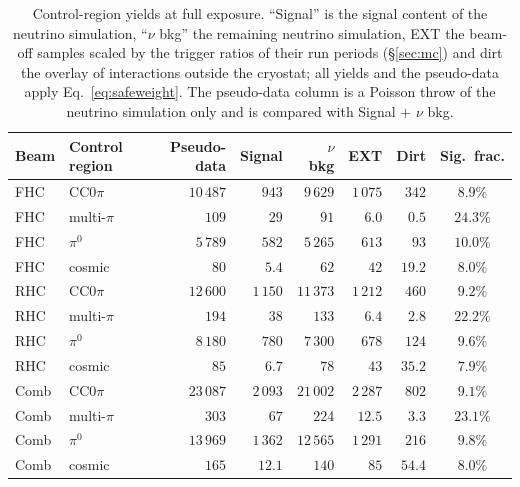 \documentclass[11pt,a4paper]{article}
\begin{document}
\begin{table}[H]
  \centering
  \caption{Control-region yields at full exposure. ``Signal'' is the signal content of the
    neutrino simulation, ``$\nu$ bkg'' the remaining neutrino simulation, EXT the beam-off samples scaled
    by the trigger ratios of their run periods (\S\ref{sec:mc}) and dirt the overlay of interactions
    outside the cryostat; all yields and the pseudo-data apply Eq.~\eqref{eq:safeweight}. The
    pseudo-data column is a Poisson throw of the neutrino simulation only and is compared with
    Signal $+$ $\nu$ bkg.}
  \label{tab:sideband_yields}
  \small
  \begin{tabular}{llrrrrrc}
    \toprule
    Beam & Control region & Pseudo-data & Signal & $\nu$ bkg & EXT & Dirt & Sig.\ frac. \\
    \midrule
    FHC & CC$0\pi$ & $10\,487$ & $943$ & $9\,629$ & $1\,075$ & $342$ & $8.9\%$ \\
    FHC & multi-$\pi$ & $109$ & $29$ & $91$ & $6.0$ & $0.5$ & $24.3\%$ \\
    FHC & $\pi^0$ & $5\,789$ & $582$ & $5\,265$ & $613$ & $93$ & $10.0\%$ \\
    FHC & cosmic & $80$ & $5.4$ & $62$ & $42$ & $19.2$ & $8.0\%$ \\
    \midrule
    RHC & CC$0\pi$ & $12\,600$ & $1\,150$ & $11\,373$ & $1\,212$ & $460$ & $9.2\%$ \\
    RHC & multi-$\pi$ & $194$ & $38$ & $133$ & $6.4$ & $2.8$ & $22.2\%$ \\
    RHC & $\pi^0$ & $8\,180$ & $780$ & $7\,300$ & $678$ & $124$ & $9.6\%$ \\
    RHC & cosmic & $85$ & $6.7$ & $78$ & $43$ & $35.2$ & $7.9\%$ \\
    \midrule
    Comb & CC$0\pi$ & $23\,087$ & $2\,093$ & $21\,002$ & $2\,287$ & $802$ & $9.1\%$ \\
    Comb & multi-$\pi$ & $303$ & $67$ & $224$ & $12.5$ & $3.3$ & $23.1\%$ \\
    Comb & $\pi^0$ & $13\,969$ & $1\,362$ & $12\,565$ & $1\,291$ & $216$ & $9.8\%$ \\
    Comb & cosmic & $165$ & $12.1$ & $140$ & $85$ & $54.4$ & $8.0\%$ \\
    \bottomrule
  \end{tabular}
\end{table}
\end{document}
